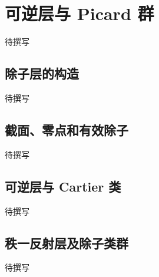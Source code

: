 
% 
% 

\section{可逆层与 Picard 群}
\label{g5:sec:1702}

待撰写

\subsection{除子层的构造}
\label{g5:subsec:1702:01}
待撰写

\subsection{截面、零点和有效除子}
\label{g5:subsec:1702:02}
待撰写

\subsection{可逆层与 Cartier 类}
\label{g5:subsec:1702:03}
待撰写

\subsection{秩一反射层及除子类群}
\label{g5:subsec:1702:04}
待撰写
